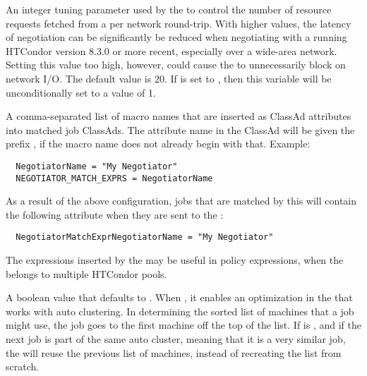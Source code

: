 \begin{description}
\label{param:NegotiatorResourceRequestListSize}
\item[\Macro{NEGOTIATOR\_RESOURCE\_REQUEST\_LIST\_SIZE}]
  An integer tuning parameter used by the  to control 
  the number of resource requests fetched from a  per 
  network round-trip.
  With higher values, 
  the latency of negotiation can be significantly be reduced
  when negotiating with a  running 
  HTCondor version 8.3.0 or more recent,
  especially over a wide-area network.
  Setting this value too high, however,
  could cause the  to unnecessarily block on network I/O.  
  The default value is 20.  If 
  is set to , then this variable will be unconditionally set
  to a value of 1.

\label{param:NegotiatorMatchExprs}
\item[\Macro{NEGOTIATOR\_MATCH\_EXPRS}]
  A comma-separated list of macro names that are inserted as
  ClassAd attributes into matched job ClassAds.
  The attribute name in the ClassAd will be given the prefix
  , 
  if the macro name does not already begin with that.
  Example:

\footnotesize
\begin{verbatim}
  NegotiatorName = "My Negotiator"
  NEGOTIATOR_MATCH_EXPRS = NegotiatorName
\end{verbatim}
\normalsize

  As a result of the above configuration, jobs that are matched by this
   will contain the following attribute when they are 
  sent to the :

\footnotesize
\begin{verbatim}
  NegotiatorMatchExprNegotiatorName = "My Negotiator"
\end{verbatim}
\normalsize

  The expressions inserted by the  may be useful in 
   policy expressions,
  when the  belongs to multiple HTCondor pools.

\label{param:NegotiatorMatchlistCaching}
\item[\Macro{NEGOTIATOR\_MATCHLIST\_CACHING}]
  A boolean value that defaults to .
  When , it enables an optimization in the 
  that works with auto clustering.
  In determining the sorted list of machines that a job might use,
  the job goes to the first machine off the top of the list. 
  If  is ,
  and if the next job is part of the same auto cluster,
  meaning that it is a very similar job,
  the  will reuse the previous list of machines,
  instead of recreating the list from scratch.


\end{description}
